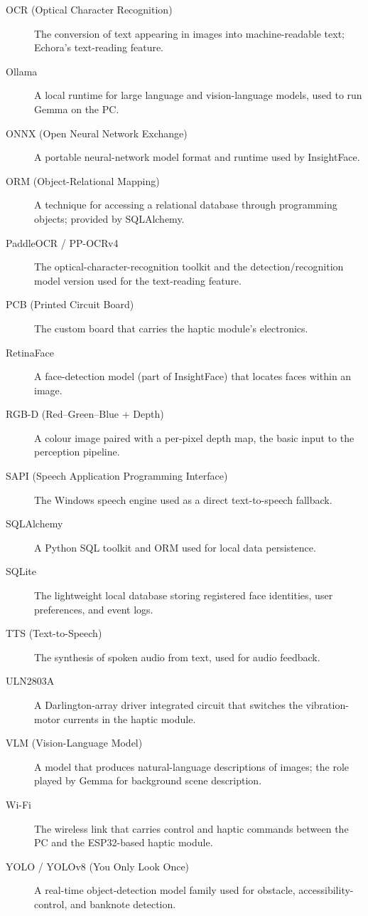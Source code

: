 \begin{description}
  \item[OCR (Optical Character Recognition)] The conversion of text appearing in images into machine-readable text; Echora's text-reading feature.

  \item[Ollama] A local runtime for large language and vision-language models, used to run Gemma on the PC.

  \item[ONNX (Open Neural Network Exchange)] A portable neural-network model format and runtime used by InsightFace.

  \item[ORM (Object-Relational Mapping)] A technique for accessing a relational database through programming objects; provided by SQLAlchemy.

  \item[PaddleOCR / PP-OCRv4] The optical-character-recognition toolkit and the detection/recognition model version used for the text-reading feature.

  \item[PCB (Printed Circuit Board)] The custom board that carries the haptic module's electronics.

  \item[RetinaFace] A face-detection model (part of InsightFace) that locates faces within an image.

  \item[RGB-D (Red--Green--Blue + Depth)] A colour image paired with a per-pixel depth map, the basic input to the perception pipeline.

  \item[SAPI (Speech Application Programming Interface)] The Windows speech engine used as a direct text-to-speech fallback.

  \item[SQLAlchemy] A Python SQL toolkit and ORM used for local data persistence.

  \item[SQLite] The lightweight local database storing registered face identities, user preferences, and event logs.

  \item[TTS (Text-to-Speech)] The synthesis of spoken audio from text, used for audio feedback.

  \item[ULN2803A] A Darlington-array driver integrated circuit that switches the vibration-motor currents in the haptic module.

  \item[VLM (Vision-Language Model)] A model that produces natural-language descriptions of images; the role played by Gemma for background scene description.

  \item[Wi-Fi] The wireless link that carries control and haptic commands between the PC and the ESP32-based haptic module.

  \item[YOLO / YOLOv8 (You Only Look Once)] A real-time object-detection model family used for obstacle, accessibility-control, and banknote detection.

\end{description}
